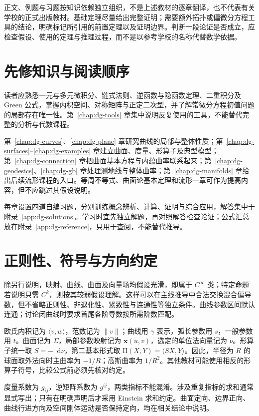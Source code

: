 \documentclass[UTF8,12pt,a4paper,fontset=fandol]{ctexbook}
\newcommand{\dd}{\mathop{}\!\mathrm d}
\newcommand{\ip}[2]{\langle #1,#2\rangle}
\newcommand{\norm}[1]{\lVert #1\rVert}
\begin{document}
正文、例题与习题按知识依赖独立组织，不是上述教材的逐章翻译，也不代表有关学校的正式出版教材。基础定理尽量给出完整证明；需要额外拓扑或偏微分方程工具的结论，明确标记所引用的前置定理以及证明边界。判断一段论证是否成立，应检查假设、使用的定理与推理过程，而不是以参考学校的名称代替数学依据。

\section{先修知识与阅读顺序}
读者应熟悉一元与多元微积分、链式法则、逆函数与隐函数定理、二重积分及 Green 公式，掌握内积空间、对称矩阵与正定二次型，并了解常微分方程初值问题的局部存在唯一性。第~\ref{chap:dg-tools} 章集中说明反复使用的工具，不能替代完整的分析与代数课程。

第~\ref{chap:dg-curves}、\ref{chap:dg-plane} 章研究曲线的局部与整体性质；第~\ref{chap:dg-surfaces}--\ref{chap:dg-examples} 章建立曲面、度量、形算子及典型模型；第~\ref{chap:dg-connection} 章把曲面基本方程与内蕴曲率联系起来；第~\ref{chap:dg-geodesics}、\ref{chap:dg-gb} 章处理测地线与整体曲率；第~\ref{chap:dg-manifolds} 章给出后续流形课程的入口。等周不等式、曲面论基本定理和流形一章可作为提高内容，但不应跳过其假设说明。

每章设置四道自编习题，分别训练概念辨析、计算、证明与综合应用，解答集中于附录~\ref{app:dg-solutions}。学习时宜先独立解题，再对照解答检查论证；公式汇总放在附录~\ref{app:dg-reference}，只用于查阅，不能替代推导。

\section{正则性、符号与方向约定}
除另行说明，映射、曲线、曲面及向量场均假设光滑，即属于 $C^\infty$ 类；特定命题若说明只需 $C^k$，则按其较弱假设理解。这样可以在主线推导中合法交换混合偏导数，但不省略正则性、非退化性、紧致性与连通性等独立条件。曲线参数区间默认连通；讨论闭曲线时要求首尾各阶导数按所需阶数匹配。

欧氏内积记为 $\ip{v}{w}$，范数记为 $\norm{v}$；曲线用 $\gamma$ 表示，弧长参数用 $s$，一般参数用 $t$。曲面记为 $\Sigma$，局部参数映射记为 $\mathbf x(u,v)$，选定的单位法向量记为 $\nu$。形算子统一取 $S=-\dd\nu$，第二基本形式取 $\mathrm{II}(X,Y)=\ip{SX}{Y}$。因此，半径为 $R$ 的球面取外法向时主曲率为 $-1/R$；高斯曲率为 $1/R^2$。其他教材可能使用相反的形算子符号，比较公式前必须先核对约定。

度量系数为 $g_{ij}$，逆矩阵系数为 $g^{ij}$，两类指标不能混淆。涉及重复指标的求和通常显式写出；只有在明确声明后才采用 Einstein 求和约定。曲面定向、边界正向、曲线行进方向及空间刚体运动是否保持定向，均在相关结论中说明。
\end{document}

